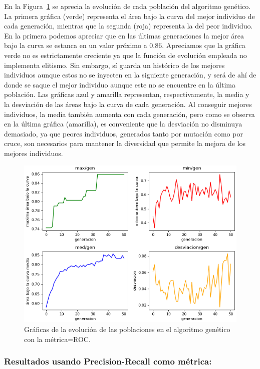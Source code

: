 \documentclass[a4paper,12pt,twoside,oldfontcommands]{memoir}
\begin{document}
En la Figura~\ref{fig:genetico} se aprecia la evolución de cada población del algoritmo genético. La primera gráfica (verde) representa el área bajo la curva del mejor individuo de cada generación, mientras que la segunda (roja) representa la del peor individuo. En la primera podemos apreciar que en las últimas generaciones la mejor área bajo la curva se estanca en un valor próximo a 0.86. Apreciamos que la gráfica verde no es estrictamente creciente ya que la función de evolución empleada no implementa elitismo. Sin embargo, sí guarda un histórico de los mejores individuos aunque estos no se inyecten en la siguiente generación, y será de ahí de donde se saque el mejor individuo aunque este no se encuentre en la última población. Las gráficas azul y amarilla representan, respectivamente, la media y la desviación de las áreas bajo la curva de cada generación. Al conseguir mejores individuos, la media también aumenta con cada generación, pero como se observa en la última gráfica (amarilla), es conveniente que la desviación no disminuya demasiado, ya que peores individuos, generados tanto por mutación como por cruce, son necesarios para mantener la diversidad que permite la mejora de los mejores individuos.  

\begin{figure}
    \centering
    \includegraphics[width=1\textwidth]{images/genetico.png}
    \caption{Gráficas de la evolución de las poblaciones en el algoritmo genético con la métrica=ROC.}
    \label{fig:genetico}
\end{figure}

\subsubsection{Resultados usando Precision-Recall como métrica:} 
\end{document}
